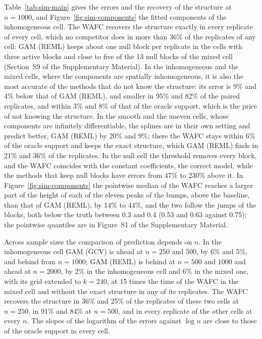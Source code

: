 \documentclass[12pt]{article} %
\theoremstyle{definition}
\theoremstyle{plain}
\begin{document}
{Table~\ref{tab:sim-main} gives the errors and the recovery of the structure at
$n = 1000$, and Figure~\ref{fig:sim-components} the fitted components of the
inhomogeneous cell. The WAFC recovers the structure exactly in every replicate
of every cell, which no competitor does in more than 36\% of the replicates of
any cell: GAM (REML) keeps about one null block per replicate in the cells with
three active blocks and close to five of the 13 null blocks of the mixed cell
(Section~S9 of the Supplementary Material). In the inhomogeneous and the mixed
cells, where the components are spatially inhomogeneous, it is also the most
accurate of the methods that do not know the structure: its error is 9\% and
4\% below that of GAM (REML), and smaller in 95\% and 82\% of the paired
replicates, and within 3\% and 8\% of that of the oracle support, which is the
price of not knowing the structure. In the smooth and the uneven cells, whose
components are infinitely differentiable, the splines are in their own
setting and predict better, GAM (REML) by 20\% and 9\%; there the WAFC stays
within 6\% of the oracle support and keeps the exact structure, which GAM
(REML) finds in 21\% and 36\% of the replicates. In the null cell the
threshold removes every block, and the WAFC coincides with the constant
coefficients, the correct model, while the methods that keep null blocks have
errors from 47\% to 230\% above it. In Figure~\ref{fig:sim-components} the
pointwise median of the WAFC reaches a larger part of the height of each of
the eleven peaks of the bumps, above the baseline, than that of GAM (REML), by
14\% to 44\%, and the two follow the jumps of the blocks, both below the
truth between 0.3 and 0.4 (0.53 and 0.63 against 0.75); the pointwise
quantiles are in Figure~S1 of the Supplementary Material.

Across sample sizes the comparison of prediction depends on $n$. In the
inhomogeneous cell GAM (GCV) is ahead at $n = 250$ and $500$, by 6\% and 5\%,
and behind from $n = 1000$; GAM (REML) is behind at $n = 500$ and $1000$ and
ahead at $n = 2000$, by 2\% in the inhomogeneous cell and 6\% in the mixed
one, with its grid extended to $k = 240$, at 15 times the time of the WAFC in
the mixed cell and without the exact structure in any of its replicates. The
WAFC recovers the structure in 36\% and 25\% of the replicates of these two
cells at $n = 250$, in 91\% and 84\% at $n = 500$, and in every replicate of
the other cells at every $n$. The slopes of the logarithm of the errors
against $\log n$ are close to those of the oracle support in every cell.

}
\end{document}
